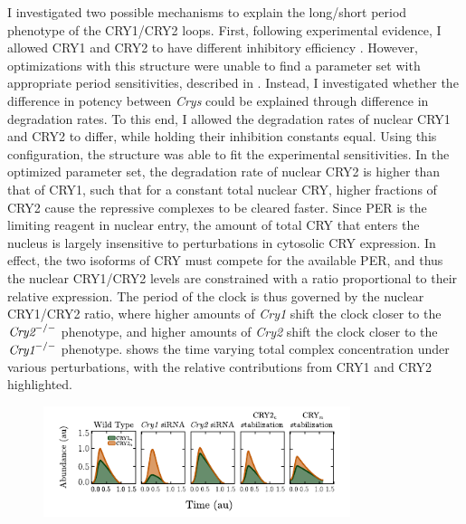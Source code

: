 I investigated two possible mechanisms to explain the long/short period phenotype of the CRY1/CRY2 loops. 
First, following experimental evidence, I allowed CRY1 and CRY2 to have different inhibitory efficiency \cite{GriffinJr.1999}. 
However, optimizations with this structure were unable to find a parameter set with appropriate period sensitivities, described in . 
Instead, I investigated whether the difference in potency between {\it Crys} could be explained through difference in degradation rates. 
To this end, I allowed the degradation rates of nuclear CRY1 and CRY2 to differ, while holding their inhibition constants equal. 
Using this configuration, the structure was able to fit the experimental sensitivities. 
In the optimized parameter set, the degradation rate of nuclear CRY2 is higher than that of CRY1, such that for a constant total nuclear CRY, higher fractions of CRY2 cause the repressive complexes to be cleared faster. 
Since PER is the limiting reagent in nuclear entry, the amount of total CRY that enters the nucleus is largely insensitive to perturbations in cytosolic CRY expression. 
In effect, the two isoforms of CRY must compete for the available PER, and thus the nuclear CRY1/CRY2 levels are constrained with a ratio proportional to their relative expression. 
The period of the clock is thus governed by the nuclear CRY1/CRY2 ratio, where higher amounts of {\it Cry1} shift the clock closer to the $\text{\it Cry2}^{-/-}$ phenotype, and higher amounts of {\it Cry2} shift the clock closer to the $\text{\it Cry1}^{-/-}$ phenotype. 
 shows the time varying total complex concentration under various perturbations, with the relative contributions from CRY1 and CRY2 highlighted.

\begin{figure}[bt]
  \centering
  \includegraphics[width=0.8\textwidth]{chap2/figures/nucleartimecourse.pdf}
  \label{fig:nucleartimecourse}
\end{figure}

